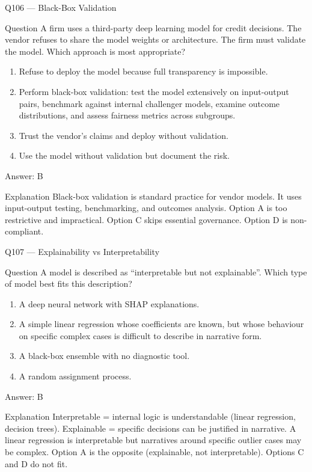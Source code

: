 \documentclass[aspectratio=169,8pt]{beamer}
\begin{document}
\begin{frame}{Q106 --- Black-Box Validation}
\begin{block}{Question}
A firm uses a third-party deep learning model for credit decisions. The vendor refuses to share the model weights or architecture. The firm must validate the model. Which approach is most appropriate?
\end{block}
\begin{enumerate}
\item Refuse to deploy the model because full transparency is impossible.
\item Perform black-box validation: test the model extensively on input-output pairs, benchmark against internal challenger models, examine outcome distributions, and assess fairness metrics across subgroups.
\item Trust the vendor's claims and deploy without validation.
\item Use the model without validation but document the risk.
\end{enumerate}
\begin{exampleblock}{Answer: B}\end{exampleblock}
\begin{block}{Explanation}
Black-box validation is standard practice for vendor models. It uses input-output testing, benchmarking, and outcomes analysis. Option A is too restrictive and impractical. Option C skips essential governance. Option D is non-compliant.
\end{block}
\end{frame}

\begin{frame}{Q107 --- Explainability vs Interpretability}
\begin{block}{Question}
A model is described as ``interpretable but not explainable''. Which type of model best fits this description?
\end{block}
\begin{enumerate}
\item A deep neural network with SHAP explanations.
\item A simple linear regression whose coefficients are known, but whose behaviour on specific complex cases is difficult to describe in narrative form.
\item A black-box ensemble with no diagnostic tool.
\item A random assignment process.
\end{enumerate}
\begin{exampleblock}{Answer: B}\end{exampleblock}
\begin{block}{Explanation}
Interpretable = internal logic is understandable (linear regression, decision trees). Explainable = specific decisions can be justified in narrative. A linear regression is interpretable but narratives around specific outlier cases may be complex. Option A is the opposite (explainable, not interpretable). Options C and D do not fit.
\end{block}
\end{frame}
\end{document}
